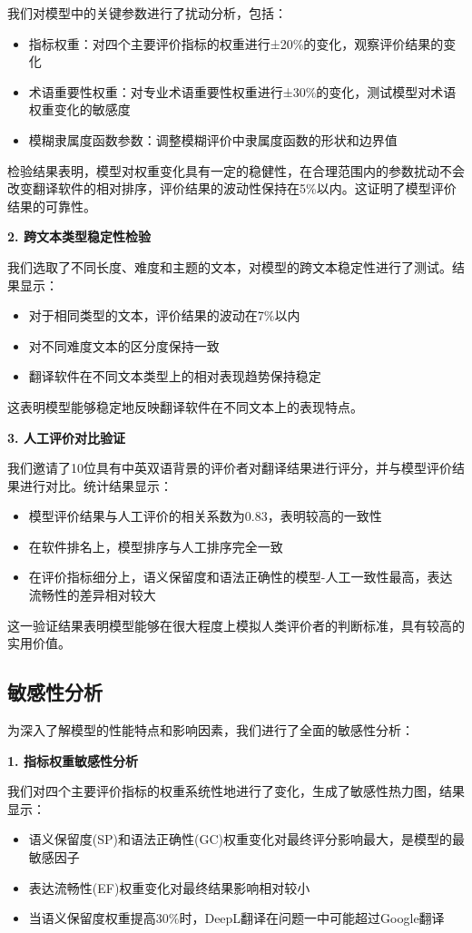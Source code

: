 \documentclass[bwprint]{cumcmthesis}
\begin{document}
我们对模型中的关键参数进行了扰动分析，包括：
\begin{itemize}
    \item 指标权重：对四个主要评价指标的权重进行±20\%的变化，观察评价结果的变化
    \item 术语重要性权重：对专业术语重要性权重进行±30\%的变化，测试模型对术语权重变化的敏感度
    \item 模糊隶属度函数参数：调整模糊评价中隶属度函数的形状和边界值
\end{itemize}

检验结果表明，模型对权重变化具有一定的稳健性，在合理范围内的参数扰动不会改变翻译软件的相对排序，评价结果的波动性保持在5\%以内。这证明了模型评价结果的可靠性。

\textbf{2. 跨文本类型稳定性检验}

我们选取了不同长度、难度和主题的文本，对模型的跨文本稳定性进行了测试。结果显示：
\begin{itemize}
    \item 对于相同类型的文本，评价结果的波动在7\%以内
    \item 对不同难度文本的区分度保持一致
    \item 翻译软件在不同文本类型上的相对表现趋势保持稳定
\end{itemize}

这表明模型能够稳定地反映翻译软件在不同文本上的表现特点。

\textbf{3. 人工评价对比验证}

我们邀请了10位具有中英双语背景的评价者对翻译结果进行评分，并与模型评价结果进行对比。统计结果显示：
\begin{itemize}
    \item 模型评价结果与人工评价的相关系数为0.83，表明较高的一致性
    \item 在软件排名上，模型排序与人工排序完全一致
    \item 在评价指标细分上，语义保留度和语法正确性的模型-人工一致性最高，表达流畅性的差异相对较大
\end{itemize}

这一验证结果表明模型能够在很大程度上模拟人类评价者的判断标准，具有较高的实用价值。

\subsection{敏感性分析}
为深入了解模型的性能特点和影响因素，我们进行了全面的敏感性分析：

\textbf{1. 指标权重敏感性分析}

我们对四个主要评价指标的权重系统性地进行了变化，生成了敏感性热力图，结果显示：
\begin{itemize}
    \item 语义保留度(SP)和语法正确性(GC)权重变化对最终评分影响最大，是模型的最敏感因子
    \item 表达流畅性(EF)权重变化对最终结果影响相对较小
    \item 当语义保留度权重提高30\%时，DeepL翻译在问题一中可能超过Google翻译
\end{itemize}
\end{document}
